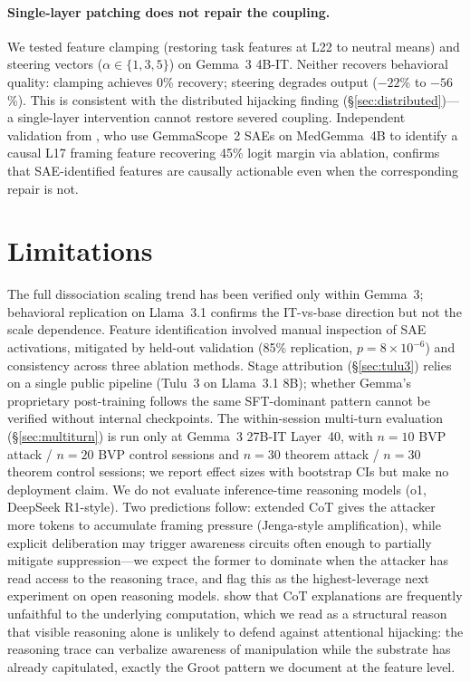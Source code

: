 \documentclass[10pt,twocolumn]{article}
\newcommand{\gemma}{Gemma~3\xspace}
\newcommand{\gemmascope}{GemmaScope~2\xspace}
\begin{document}
\paragraph{Single-layer patching does not repair the coupling.}
We tested feature clamping (restoring task features at L22 to neutral means) and steering vectors ($\alpha \in \{1, 3, 5\}$) on \gemma 4B-IT. Neither recovers behavioral quality: clamping achieves 0\% recovery; steering degrades output ($-22$\% to $-56$\%). This is consistent with the distributed hijacking finding (\S\ref{sec:distributed})---a single-layer intervention cannot restore severed coupling. Independent validation from \citet{sadanandan2026psfmed}, who use \gemmascope SAEs on MedGemma~4B to identify a causal L17 framing feature recovering 45\% logit margin via ablation, confirms that SAE-identified features are causally actionable even when the corresponding repair is not.

\section{Limitations}
\label{sec:limitations}

The full dissociation scaling trend has been verified only within \gemma; behavioral replication on Llama~3.1 confirms the IT-vs-base direction but not the scale dependence.
Feature identification involved manual inspection of SAE activations, mitigated by held-out validation (85\% replication, $p = 8 \times 10^{-6}$) and consistency across three ablation methods.
Stage attribution (\S\ref{sec:tulu3}) relies on a single public pipeline (Tulu~3 on Llama~3.1 8B); whether Gemma's proprietary post-training follows the same SFT-dominant pattern cannot be verified without internal checkpoints.
The within-session multi-turn evaluation (\S\ref{sec:multiturn}) is run only at \gemma 27B-IT Layer~40, with $n = 10$ BVP attack / $n = 20$ BVP control sessions and $n = 30$ theorem attack / $n = 30$ theorem control sessions; we report effect sizes with bootstrap CIs but make no deployment claim.
We do not evaluate inference-time reasoning models (o1, DeepSeek R1-style).
Two predictions follow: extended CoT gives the attacker more tokens to accumulate framing pressure (Jenga-style amplification), while explicit deliberation may trigger awareness circuits often enough to partially mitigate suppression---we expect the former to dominate when the attacker has read access to the reasoning trace, and flag this as the highest-leverage next experiment on open reasoning models.
\citet{lanham2023faithfulness} show that CoT explanations are frequently unfaithful to the underlying computation, which we read as a structural reason that visible reasoning alone is unlikely to defend against attentional hijacking: the reasoning trace can verbalize awareness of manipulation while the substrate has already capitulated, exactly the Groot pattern we document at the feature level.
\end{document}
